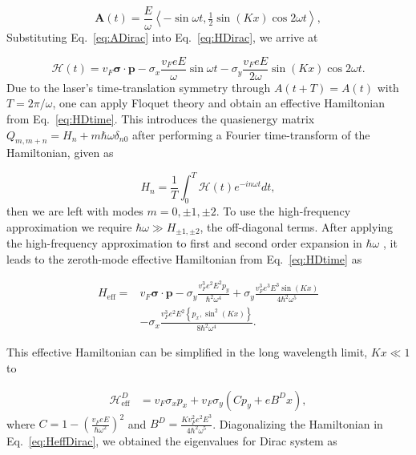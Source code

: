 \documentclass[aps,prb,twocolumn,showpacs,superscriptaddress]{revtex4-2}
\renewcommand{\vec}[1]{\mathbf{#1}}
\newcommand{\ham}{\mathcal{H}}
\begin{document}
\begin{equation}\label{eq:ADirac}
  \vec{A}(t)= \dfrac{E}{\omega} \left\langle -\sin \omega t, \tfrac{1}{2}\sin(Kx) \cos 2\omega t \right\rangle,
\end{equation}%
Substituting Eq.~\eqref{eq:ADirac} into Eq.~\eqref{eq:HDirac}, we arrive at%

\begin{equation}\label{eq:HDtime}
  \ham(t)= v_{F}\bm{\sigma}\cdot\vec{p} - \sigma _{x} \dfrac{v_F eE}{\omega} \sin {\omega t} - \sigma _{y} \dfrac{v_F eE}{2\omega}\sin{(Kx)} \cos2\omega t.
\end{equation}%
Due to the laser's time-translation symmetry through $A(t+T)=A(t)$ with $T=2\pi /\omega $, one can apply Floquet theory \cite{AEE, MBL, supp} and obtain an effective Hamiltonian from Eq.~\eqref{eq:HDtime}.
This introduces the quasienergy matrix $Q_{m,m+n} = H_n + m\hbar\omega\delta_{n0}$ after performing a Fourier time-transform of the Hamiltonian, given as

\begin{equation} \label{eq:fourier-time-transform}
  H_n = \dfrac{1}{T} \int_{0}^{T} \ham(t) e^{-in\omega t} dt,
\end{equation}
then we are left with modes $m=0,\pm1,\pm2$.
To use the high-frequency approximation we require $\hbar\omega \gg H_{\pm1,\pm2}$, the off-diagonal terms.
After applying the high-frequency approximation to first and second order expansion in $\hbar\omega$ \cite{supp}, it leads to the zeroth-mode effective Hamiltonian from Eq.~\eqref{eq:HDtime} as

\begin{align} \label{eq:HDeff}
  H_{\text{eff}}= &v_{F}\bm{\sigma}\cdot\vec{p}-\sigma_y\frac{v_F^3 e^2 E^2 p_y}{\hbar^{2}\omega^{4}}
  +\sigma_y\frac{v_F^3 e^3 E^{3}\sin{(Kx)}}{4\hbar^{2}\omega^{5}} \nonumber \\
  &-\sigma_x\frac{v_F^3 e^2 E^2 \left\{p_x, \sin^2{(Kx)} \right\} }{8\hbar^{2}\omega^{4}}.
\end{align}

This effective Hamiltonian can be simplified in the long wavelength limit, $Kx \ll 1$ to

\begin{align} \label{eq:HeffDirac}
  \ham_{\text{eff}}^D &= v_{F}\sigma_{x}p_{x}+v_F\sigma_{y} \left( C p_{y} + eB^Dx \right),
\end{align}%
where $C = 1-\left(\tfrac{v_{F}eE}{\hbar\omega^2}\right)^2$ and $B^D=\frac{Kv_F^2 e^2E^3}{4\hbar^{2}\omega^{5}}$.
Diagonalizing the Hamiltonian in Eq.~\eqref{eq:HeffDirac}, we obtained the eigenvalues for Dirac system as%
\end{document}
